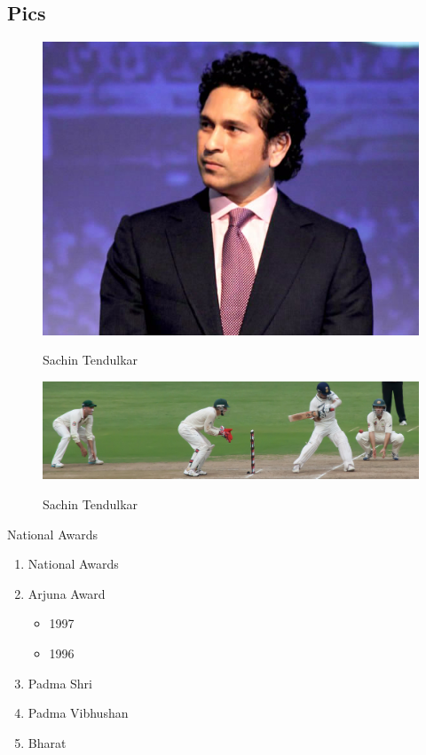 \documentclass{report}
\begin{document}
\subsection{Pics}
\begin{figure}
	\centering
	\includegraphics[scale=0.5]{Sachin-01}
	\label{sachinface}
	\caption{Sachin Tendulkar}

\end{figure}

\begin{figure}
	\centering
	\includegraphics[scale=0.40]{Sachin-02}
	\label{sachinface}
	\caption{Sachin Tendulkar}
	
\end{figure}

National Awards
\begin{enumerate}
	\item National Awards
	\item Arjuna Award
		\begin{itemize}
			\item 1997
			\item 1996
		\end{itemize}
	\item Padma Shri
	\item Padma Vibhushan
	\item Bharat

\end{enumerate}
\end{document}
